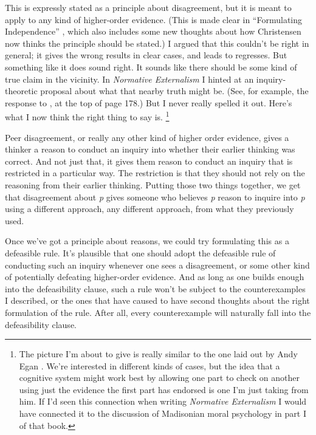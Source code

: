 \documentclass[
  11pt,
]{book}
\begin{document}
This is expressly stated as a principle about disagreement, but it is meant to apply to any kind of higher-order evidence. (This is made clear in ``Formulating Independence'' \citep{Christensen2019}, which also includes some new thoughts about how Christensen now thinks the principle should be stated.) I argued that this couldn't be right in general; it gives the wrong results in clear cases, and leads to regresses. But something like it does sound right. It sounds like there should be some kind of true claim in the vicinity. In \emph{Normative Externalism} I hinted at an inquiry-theoretic proposal about what that nearby truth might be. (See, for example, the response to \citet{Littlejohn2015}, at the top of page 178.) But I never really spelled it out. Here's what I now think the right thing to say is. \footnote{The picture I'm about to give is really similar to the one laid out by Andy Egan \citeyearpar{Egan2008}. We're interested in different kinds of cases, but the idea that a cognitive system might work best by allowing one part to check on another using just the evidence the first part has endorsed is one I'm just taking from him. If I'd seen this connection when writing \emph{Normative Externalism} I would have connected it to the discussion of Madisonian moral psychology in part I of that book.}

Peer disagreement, or really any other kind of higher order evidence, gives a thinker a reason to conduct an inquiry into whether their earlier thinking was correct. And not just that, it gives them reason to conduct an inquiry that is restricted in a particular way. The restriction is that they should not rely on the reasoning from their earlier thinking. Putting those two things together, we get that disagreement about \emph{p} gives someone who believes \emph{p} reason to inquire into \emph{p} using a different approach, any different approach, from what they previously used.

Once we've got a principle about reasons, we could try formulating this as a defeasible rule. It's plausible that one should adopt the defeasible rule of conducting such an inquiry whenever one sees a disagreement, or some other kind of potentially defeating higher-order evidence. And as long as one builds enough into the defeasibility clause, such a rule won't be subject to the counterexamples I described, or the ones that have caused \citet{Christensen2019} to have second thoughts about the right formulation of the rule. After all, every counterexample will naturally fall into the defeasibility clause.
\end{document}
